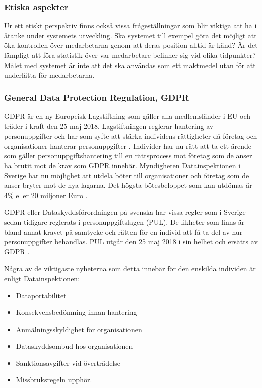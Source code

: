 \documentclass[swedish, a4paper,12pt]{article}
\begin{document}
\subsubsection{Etiska aspekter}
Ur ett etiskt perspektiv finns också vissa frågeställningar som blir viktiga att ha i åtanke under systemets utveckling. Ska systemet till exempel göra det möjligt att öka kontrollen över medarbetarna genom att deras position alltid är känd? Är det lämpligt att föra statistik över var medarbetare befinner sig vid olika tidpunkter?
Målet med systemet är inte att det ska användas som ett maktmedel utan för att underlätta för medarbetarna.

\subsubsection{General Data Protection Regulation, GDPR}
GDPR är en ny Europeisk Lagstiftning som gäller alla medlemsländer i EU och träder i kraft den 25 maj 2018.
Lagstiftningen reglerar hantering av personuppgifter och har som syfte att stärka individens rättigheter då företag och organisationer hanterar personuppgifter \cite{GDPRibm} \cite{GDPRdatainspektionen}.
Individer har nu rätt att ta ett ärende som gäller personuppgiftshantering till en rättsprocess mot företag som de anser ha brutit mot de krav som GDPR innebär.
Myndigheten Datainspektionen i Sverige har nu möjlighet att utdela böter till organisationer och företag som de anser bryter mot de nya lagarna. Det högsta bötesbeloppet som kan utdömas är 4\% %
eller 20 miljoner Euro \cite{GDPRibm}.

GDPR eller Dataskyddsförordningen på svenska har vissa regler som i Sverige sedan tidigare reglerats i personuppgiftslagen (PUL). De likheter som finns är bland annat kravet på samtycke och rätten för en individ att få ta del av hur personuppgifter behandlas. PUL utgår den 25 maj 2018 i sin helhet och ersätts av GDPR \cite{GDPRdatainspektionen}.

Några av de viktigaste nyheterna som detta innebär för den enskilda individen är enligt Datainspektionen\cite{GDPRdatainspektionen}:
\begin{itemize}
  \item Dataportabilitet
  \item Konsekvensbedömning innan hantering
  \item Anmälningsskyldighet för organisationen
  \item Dataskyddsombud hos organisationen
  \item Sanktionsavgifter vid överträdelse
  \item Missbruksregeln upphör.
\end{itemize}
\end{document}
